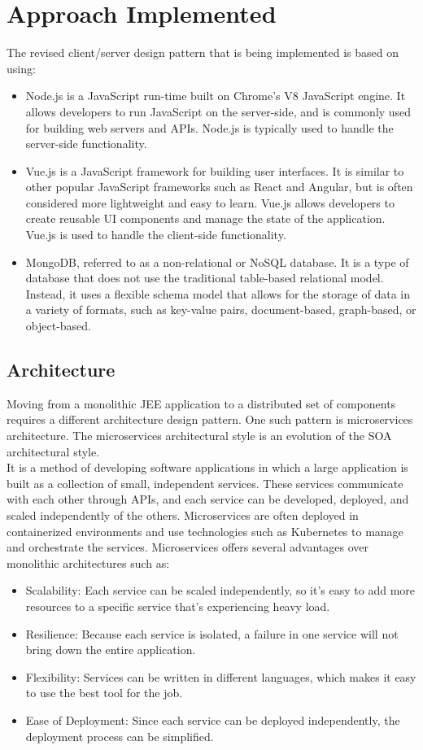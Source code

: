 \section{Approach Implemented}
The revised client/server design pattern that is being implemented is based on using:
\begin{itemize}
\item Node.js is a JavaScript run-time built on Chrome's V8 JavaScript engine. It allows developers to run JavaScript on the server-side, and is commonly used for building web servers and APIs. Node.js is typically used to handle the server-side functionality.
\item Vue.js is a JavaScript framework for building user interfaces. It is similar to other popular JavaScript frameworks such as React and Angular, but is often considered more lightweight and easy to learn. Vue.js allows developers to create reusable \ac{UI} components and manage the state of the application. Vue.js is used to handle the client-side functionality.
\item MongoDB, referred to as a non-relational or NoSQL database. It is a type of database that does not use the traditional table-based relational model. Instead, it uses a flexible schema model that allows for the storage of data in a variety of formats, such as key-value pairs, document-based, graph-based, or object-based.
\end{itemize}
\subsection{Architecture}
Moving from a monolithic \ac{JEE} application to a distributed set of components requires a different architecture design pattern. One such pattern is microservices architecture. The microservices architectural style is an evolution of the \ac{SOA} architectural style.\vspace{5mm} \\
It is a method of developing software applications in which a large application is built as a collection of small, independent services. These services communicate with each other through APIs, and each service can be developed, deployed, and scaled independently of the others. Microservices are often deployed in containerized environments and use technologies such as Kubernetes to manage and orchestrate the services. Microservices offers several advantages over monolithic architectures such as:
\begin{itemize}
\item Scalability: Each service can be scaled independently, so it's easy to add more resources to a specific service that's experiencing heavy load.
\item Resilience: Because each service is isolated, a failure in one service will not bring down the entire application.
\item Flexibility: Services can be written in different languages, which makes it easy to use the best tool for the job.
\item Ease of Deployment: Since each service can be deployed independently, the deployment process can be simplified.
\end{itemize}
